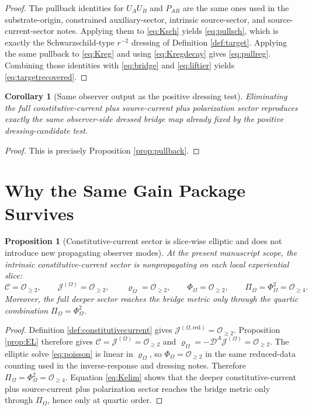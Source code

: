\documentclass[11pt]{article}
\newcommand{\ProjSub}{P}
\newcommand{\SpatialD}{\mathcal D}
\newcommand{\FlowPot}{\Phi_\Omega}
\newcommand{\BalanceField}{\Pi_\Omega}
\newcommand{\SourceDensity}{\varrho_\Omega}
\newcommand{\SourceCurrent}{\mathcal J^{(\Omega)}}
\newcommand{\SourceCurrentRed}{\mathcal J^{(\Omega,\mathrm{red})}}
\newcommand{\ConstCurrent}{\mathcal C}
\newtheorem{proposition}{Proposition}
\newtheorem{corollary}{Corollary}
\begin{document}
\begin{proof}
The pullback identities for \(U_AU_B\) and \(\ProjSub_{AB}\) are the same ones used in the substrate-origin, constrained auxiliary-sector, intrinsic source-sector, and source-current-sector notes. Applying them to \eqref{eq:Ksch} yields \eqref{eq:pullsch}, which is exactly the Schwarzschild-type \(r^{-2}\) dressing of Definition \ref{def:target}. Applying the same pullback to \eqref{eq:Kreg} and using \eqref{eq:Kregdecay} gives \eqref{eq:pullreg}. Combining those identities with \eqref{eq:bridge} and \eqref{eq:liftier} yields \eqref{eq:targetrecovered}.
\end{proof}

\begin{corollary}[Same observer output as the positive dressing test]
\label{cor:sameoutput}
Eliminating the full constitutive-current plus source-current plus polarization sector reproduces exactly the same observer-side dressed bridge map already fixed by the positive dressing-candidate test.
\end{corollary}

\begin{proof}
This is precisely Proposition \ref{prop:pullback}.
\end{proof}

\section{Why the Same Gain Package Survives}

\begin{proposition}[Constitutive-current sector is slice-wise elliptic and does not introduce new propagating observer modes]
\label{prop:elliptic}
At the present manuscript scope, the intrinsic constitutive-current sector is nonpropagating on each local experiential slice:
\begin{equation}
\ConstCurrent=\mathcal O_{\ge 2},
\qquad
\SourceCurrent=\mathcal O_{\ge 2},
\qquad
\SourceDensity=\mathcal O_{\ge 2},
\qquad
\FlowPot=\mathcal O_{\ge 2},
\qquad
\BalanceField=\FlowPot^2=\mathcal O_{\ge 4}.
\label{eq:orders}
\end{equation}
Moreover, the full deeper sector reaches the bridge metric only through the quartic combination \(\BalanceField=\FlowPot^2\).
\end{proposition}

\begin{proof}
Definition \ref{def:constitutivecurrent} gives \(\SourceCurrentRed=\mathcal O_{\ge 2}\). Proposition \ref{prop:EL} therefore gives \(\ConstCurrent=\SourceCurrent=\mathcal O_{\ge 2}\) and \(\SourceDensity=-\SpatialD^A\SourceCurrent=\mathcal O_{\ge 2}\). The elliptic solve \eqref{eq:poisson} is linear in \(\SourceDensity\), so \(\FlowPot=\mathcal O_{\ge 2}\) in the same reduced-data counting used in the inverse-response and dressing notes. Therefore \(\BalanceField=\FlowPot^2=\mathcal O_{\ge 4}\). Equation \eqref{eq:Kelim} shows that the deeper constitutive-current plus source-current plus polarization sector reaches the bridge metric only through \(\BalanceField\), hence only at quartic order.
\end{proof}
\end{document}
